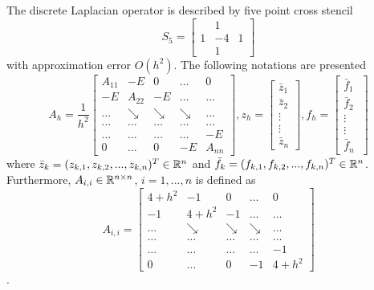 \documentclass[11pt,a4paper,twoside]{article}
\begin{document}
The discrete Laplacian operator is described by five point cross stencil
\[
S_5 = 
\begin{bmatrix}
            &  1  &  \\
    1     &  -4    & 1\\
            &  1  &  
\end{bmatrix}
\]
with approximation error $O(h^2)$. The following notations are presented
\[
A_h = \frac{1}{h^2}
\begin{bmatrix}
    A_{11}       & -E          &  0              & \dots & 0 \\
    -E               & A_{22}  & -E              & \dots & \dots  \\
      \dots         & \searrow     & \searrow  & \searrow  & \dots  \\
      \dots         & \dots     & \dots         & \dots   &    \dots  \\
      \dots         & \dots    & \dots         & \dots & -E  \\
     0                 & \dots   &  0               & -E    & A_{nn}
\end{bmatrix}
,
z_h = 
\begin{bmatrix}
    \bar z_{1} \\
    \bar z_{2}  \\
    \vdots  \\
    \vdots  \\
    \bar z_{n}
\end{bmatrix}
,
f_h = 
\begin{bmatrix}
    \bar f_{1} \\
    \bar f_{2}  \\
    \vdots  \\
    \vdots  \\
    \bar f_{n}\
\end{bmatrix}
\]
where $\bar z_k = (z_{k,1}, z_{k,2}, ..., z_{k,n})^T\in \mathbb{R}^{n}$ and $\bar f_k = (f_{k,1}, f_{k,2}, ..., f_{k,n})^T\in \mathbb{R}^{n}$. Furthermore, $A_{i,i} \in \mathbb{R}^{n \times n}$, $i = 1, ..., n$ is defined as
\[
A_{i,i} = 
\begin{bmatrix}
    4+h^2       & -1          &  0              & \dots & 0 \\
    -1               & 4+h^2  & -1              & \dots & \dots  \\
      \dots         & \searrow     & \searrow  & \searrow  & \dots  \\
      \dots         & \dots     & \dots         & \dots   &    \dots  \\
      \dots         & \dots    & \dots         & \dots & -1  \\
     0                 & \dots   &  0               & -1    & 4+h^2
\end{bmatrix}
\].
\end{document}
